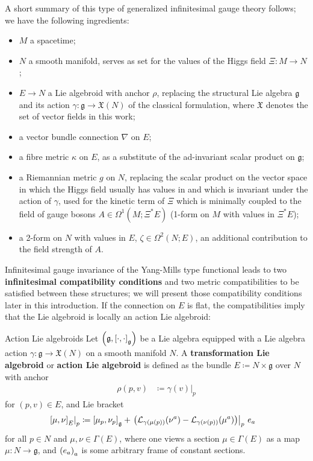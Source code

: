 \documentclass[reqno,a4paper,oneside]{amsart}
\theoremstyle{plain}
\theoremstyle{remark}
\theoremstyle{definition}
\begin{document}
A short summary of this type of generalized infinitesimal gauge theory follows; we have the following ingredients:
\begin{itemize}
	\item $M$ a spacetime;
	\item $N$ a smooth manifold, serves as set for the values of the Higgs field $\Xi: M \to N$;
	\item $E \to N$ a Lie algebroid with anchor $\rho$, replacing the structural Lie algebra $\mathfrak{g}$ and its action $\gamma: \mathfrak{g} \to \mathfrak{X}(N)$ of the classical formulation, where $\mathfrak{X}$ denotes the set of vector fields in this work;
	\item a vector bundle connection $\nabla$ on $E$;
	\item a fibre metric $\kappa$ on $E$, as a substitute of the ad-invariant scalar product on $\mathfrak{g}$;
	\item a Riemannian metric $g$ on $N$, replacing the scalar product on the vector space in which the Higgs field usually has values in and which is invariant under the action of $\gamma$, used for the kinetic term of $\Xi$ which is minimally coupled to the field of gauge bosons $A \in \Omega^1(M; \Xi^*E)$ (1-form on $M$ with values in $\Xi^*E$);
	\item a 2-form on $N$ with values in $E$, $\zeta \in \Omega^2(N;E)$, an additional contribution to the field strength of $A$.
\end{itemize}

Infinitesimal gauge invariance of the Yang-Mills type functional leads to two \textbf{infinitesimal compatibility conditions} and two metric compatibilities to be satisfied between these structures; we will present those compatibility conditions later in this introduction. If the connection on $E$ is flat, the compatibilities imply that the Lie algebroid is locally an action Lie algebroid:

\begin{definitions*}{Action Lie algebroids}
Let $\mleft(\mathfrak{g}, \mleft[\cdot, \cdot \mright]_{\mathfrak{g}}\mright)$ be a Lie algebra equipped with a Lie algebra action $\gamma: \mathfrak{g} \to \mathfrak{X}(N)$ on a smooth manifold $N$. A \textbf{transformation Lie algebroid} or \textbf{action Lie algebroid} is defined as the bundle $E \coloneqq N \times \mathfrak{g}$ over $N$ with anchor
\begin{align*}
\rho(p, v) &\coloneqq \gamma(v)|_p
\end{align*}
for $(p, v) \in E$, and Lie bracket
\begin{align*}
	\mleft.\mleft[\mu, \nu\mright]_E\mright|_p
	&\coloneqq 
	\mleft[\mu_p, \nu_p\mright]_{\mathfrak{g}}
		+ \mleft.\mleft(\mathcal{L}_{\gamma(\mu(p))}(\nu^a) - \mathcal{L}_{\gamma(\nu(p))}(\mu^a) \mright)\mright|_p ~ e_a
\end{align*}
	for all $p \in N$ and $\mu, \nu \in \Gamma(E)$, where one views a section $\mu \in \Gamma(E)$ as a map $\mu: N \to \mathfrak{g}$, and $\mleft( e_a \mright)_a$ is some arbitrary frame of constant sections.
\end{definitions*}
\end{document}
